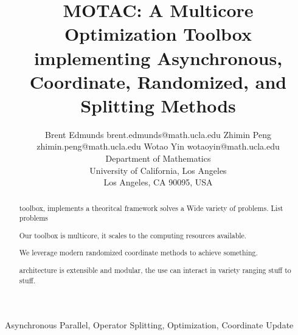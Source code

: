 \documentclass[twoside,11pt]{article}
\newcommand{\pkg}{{MOTAC}}
\begin{document}
\title{\pkg: A Multicore Optimization Toolbox implementing Asynchronous, Coordinate, Randomized, and Splitting Methods}

\author{\name Brent Edmunds \email brent.edmunds@math.ucla.edu
       \AND
       \name Zhimin Peng \email zhimin.peng@math.ucla.edu
       \AND
	\name Wotao Yin \email wotaoyin@math.ucla.edu \\
       \addr Department of Mathematics\\
       University of California, Los Angeles\\
       Los Angeles, CA 90095, USA}	

\maketitle

\begin{abstract}
toolbox, implements a theoritcal framework solves a  Wide variety of problems.
	List problems

Our toolbox is multicore, it scales to the computing resources available.

We leverage modern randomized coordinate methods to achieve something.

architecture is extensible and modular, the use can interact in variety ranging stuff to stuff.
\end{abstract}

\begin{keywords}
Asynchronous Parallel, Operator Splitting, Optimization, Coordinate Update
\end{keywords}








% 

%

%

%


% 


% 

% 

% 




\end{document}
